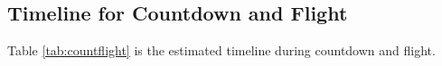 \subsection{Timeline for Countdown and Flight}
Table \ref{tab:countflight} is the estimated timeline during countdown and flight. 

